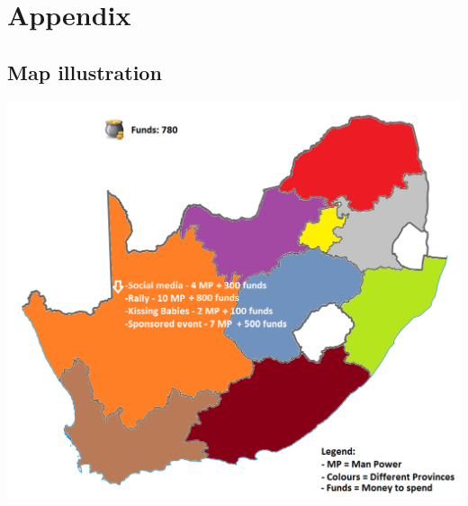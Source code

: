 \documentclass{article}
\begin{document}
	\section{Appendix}
		\subsection{Map illustration}
			\includegraphics[width=1\linewidth]{Images/MAP.png}\\
\end{document}
